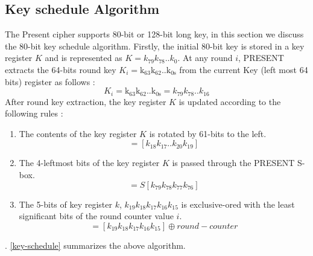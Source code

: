 \documentclass[preprint]{transcrypto}
\begin{document}
\subsection{Key schedule Algorithm}
The Present cipher supports 80-bit or 128-bit long key, in this section we discuss the 80-bit key schedule algorithm. Firstly, the initial 80-bit key is stored in a key register $K$ and is represented as $K = k_{79}k_{78}$..$k_0$. At any round $i$, PRESENT extracts the 64-bits round key $K_i = \mathrm{k_{63}}\mathrm{k_{62}}$..$\mathrm{k_{0s}}$ from the current Key (left most 64 bits) register as follows : 
\begin{equation*}
    K_i = \mathrm{k_{63}}\mathrm{k_{62}}..\mathrm{k_{0s}} = k_{79}k_{78}..k_{16}
\end{equation*}
After round key extraction, the key register $K$ is updated according to the following rules : 
\begin{enumerate}
    \item The contents of the key register $K$ is rotated by 61-bits to the left.
    \begin{equation*}
        [k_{79}k_{78}..k_{0}] = [k_{18}k_{17}..k_{20}k_{19}]
    \end{equation*}
    \item The 4-leftmost bits of the key register $K$ is passed through the PRESENT S-box.
    \begin{equation*}
        [k_{79}k_{78}k_{77}k_{76}] = S[k_{79}k_{78}k_{77}k_{76}]
    \end{equation*}
    \item The 5-bits of key register $k$, $k_{19}k_{18}k_{17}k_{16}k_{15}$ is exclusive-ored with the least significant bits of the round counter value $i$. 
    \begin{equation*}
        [k_{19}k_{18}k_{17}k_{16}k_{15}] = [k_{19}k_{18}k_{17}k_{16}k_{15}] \oplus round-counter
    \end{equation*}
\end{enumerate}
\figurename. {\ref{key-schedule}} summarizes the above algorithm.
\end{document}
